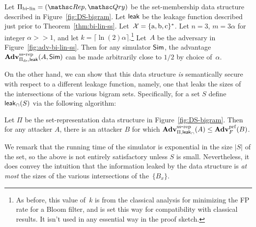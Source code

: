 \begin{theorem}\label{thm:bi-ds-ss}
Let $\setprim_{\bilin}= (\Rep, \Qry)$ be the set-membership data
structure described in Figure~\ref{fig:DS-bigram}. Let ${\sf leak}$ be
the leakage function described just prior to
Theorem~\ref{thm:bi-lin-ss}. Let~${\cal X}=\{\mathrm{a,b,c}\}^*$. Let
$n=3$,  $m=3\alpha $ for integer $\alpha >> 1$, and let $k = \lceil
\ln(2) \alpha \rceil$.\footnote{As before, this value of~$k$ is from the
classical analysis for minimizing the FP rate for a Bloom filter,
and is set this way for compatibility with classical results.  It
isn't used in any essential way in the proof sketch.}  Let~$A$ be
the adversary in Figure~\ref{fig:adv-bi-lin-ss}.  Then for any
simulator ${\sf Sim}$, the advantage
$\mathrm{\mathbf{Adv}}^{\mathrm{ss\mbox{-}rep}}_{\Pi_{\mathrm{ds}},{\sf leak}}(A,{\sf Sim})$ can be made
arbitrarily close to $1/2$ by choice of~$\alpha$.
\end{theorem}

On the other hand, we can show that this data structure \emph{is}
semantically secure with respect to a different leakage function,
namely, one that leaks the sizes of the intersections of the various
bigram sets. Specifically, for a set $S$ define ${\sf leak}_\cap(S)$
via the following algorithm:

\begin{figure}[h]
\centering
{}
\end{figure}

\begin{theorem} \label{thm:bi-ds-prf-priv-ss}
Let $\Pi$ be the set-representation data structure in
Figure~\ref{fig:DS-bigram}. Then for any attacker $A$, there is an
attacker $B$ 
for which
$\mathrm{\mathbf{Adv}}^{\mathrm{ss\mbox{-}rep}}_{\Pi,{\sf leak}_\cap}(A) \leq \mathbf{Adv}^{\mathrm{prf}}_{F}(B)$.
\end{theorem}

We remark that the running time of the simulator is exponential in
the size $|S|$ of the set, so the above is not entirely satisfactory
unless $S$ is small. Nevertheless, it does convey the intuition that
the information leaked by the data structure is \emph{at most} the
sizes of the various intersections of the~$\{B_x\}$.

